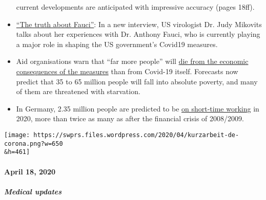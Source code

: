 \begin{itemize}
  current developments are anticipated with impressive accuracy (pages
  18ff).
\item
  \href{https://childrenshealthdefense.org/news/the-truth-about-fauci-featuring-dr-judy-mikovits/}{``The
  truth about Fauci''}: In a new interview, US virologist Dr. Judy
  Mikovits talks about her experiences with Dr. Anthony Fauci, who is
  currently playing a major role in shaping the US government's Covid19
  measures.
\item
  Aid organisations warn that ``far more people'' will
  \href{https://www.welt.de/wirtschaft/article207092745/Corona-Pandemie-Rezession-beschert-der-Welt-die-noch-groessere-Katastrophe.html}{die
  from the economic consequences of the measures} than from Covid-19
  itself. Forecasts now predict that 35 to 65 million people will fall
  into absolute poverty, and many of them are threatened with
  starvation.
\item
  In Germany, 2.35 million people are predicted to be
  \href{https://www.boeckler.de/pdf/p_wsi_pb_38_2020.pdf}{on short-time
  working} in 2020, more than twice as many as after the financial
  crisis of 2008/2009.
\end{itemize}

\texttt{[image: https://swprs.files.wordpress.com/2020/04/kurzarbeit-de-corona.png?w=650\\\&h=461]}

\hypertarget{april-18-2020}{%
\paragraph{April 18, 2020}\label{april-18-2020}}

\hypertarget{medical-updates-2}{%
\subparagraph{\texorpdfstring{\textbf{Medical
updates}}{Medical updates}}\label{medical-updates-2}}

